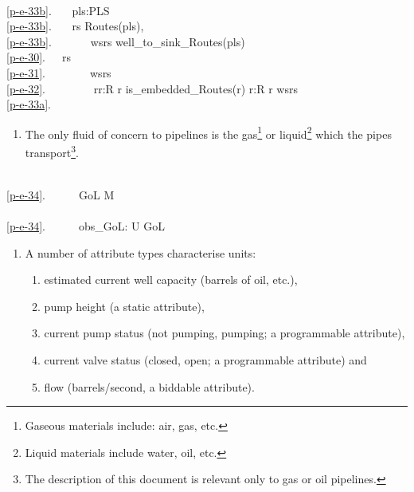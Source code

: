 \bp
\>\ \\
\ref{p-e-33b}.\ \ \ {\ALL} pls:PLS {\RDOT}\\
\ref{p-e-33b}.\ \ \  rs {\EQ} Routes(pls),\\
\ref{p-e-33b}.\ \ \ \ \ \ \ wsrs {\EQ} well\_to\_sink\_Routes(pls) \\
\ref{p-e-30}.\ \ \ rs {\EQ} \\
\ref{p-e-31}.\ \ \ \ \ \ \ \ wsrs {\UNION}\\
\ref{p-e-32}.\ \ \ \ \ \ \ \ {\UNION} {\LBRACE}{\LBRACE}r{\PRIM}{\BAR}r{\PRIM}:R {\RDOT} r{\PRIM} {\ISIN} is\_embedded\_Routes(r{\PRIM}{\PRIM}){\RBRACE} {\BAR} r{\PRIM}{\PRIM}:R {\RDOT} r{\PRIM}{\PRIM} {\ISIN} wsrs{\RBRACE}\\
\ref{p-e-33a}.\ \ \ 
\ep


\begin{enumerate}\setei
\item \label{p-e-34} The only fluid of concern to pipelines is the
                     gas\footnote{\LLLL Gaseous materials include: air, gas,
                     etc.} or liquid\footnote{\LLLL Liquid materials include
                     water, oil, etc.} which the pipes
                     transport\footnote{\LLLL The description of this
                     document is relevant only to gas or oil pipelines.}.
\savei\end{enumerate}

\bp
\>\ \\
\ref{p-e-34}.\ \ \ \ \ \ GoL {\LBRACKET} {\EQ} M {\RBRACKET} \\
\>\ \\
\ref{p-e-34}.\ \ \ \ \ \ obs\_GoL: U {\RIGHTARROW} GoL\ \ 
\ep

\LLLL

\HHHH


\begin{enumerate}\setei
\item A number of attribute types characterise units:
\begin{enumerate}
\item \label{pa01x} estimated current well capacity (barrels of oil, etc.),
\item \label{pa03x} pump height (a static attribute), 
\item \label{pa04x} current pump status (not pumping, pumping; a programmable attribute),
\item \label{pa05x} current valve status (closed, open; a programmable attribute) and
\item \label{pa06x} flow (barrels/second, a biddable attribute).
\end{enumerate}
\savei\end{enumerate}

